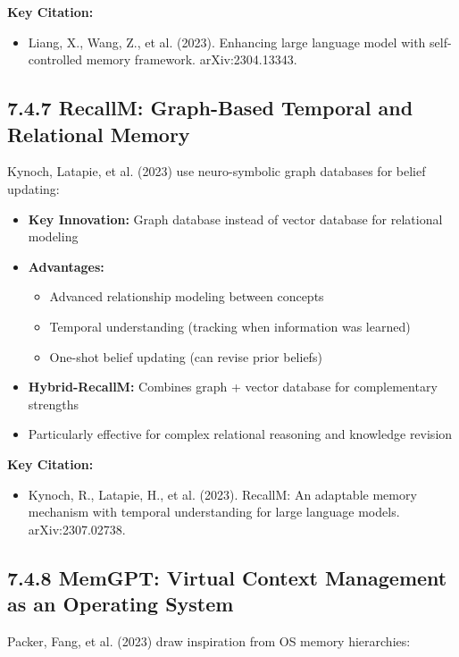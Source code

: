\documentclass[11pt,letterpaper]{article}
\begin{document}
\textbf{Key Citation:}
\begin{itemize}[leftmargin=*]
    \item Liang, X., Wang, Z., et al. (2023). Enhancing large language model with self-controlled memory framework. arXiv:2304.13343.
\end{itemize}

\subsection{7.4.7 RecallM: Graph-Based Temporal and Relational Memory}

Kynoch, Latapie, et al. (2023) use neuro-symbolic graph databases for belief updating:

\begin{itemize}[leftmargin=*]
    \item \textbf{Key Innovation:} Graph database instead of vector database for relational modeling
    \item \textbf{Advantages:}
    \begin{itemize}
        \item Advanced relationship modeling between concepts
        \item Temporal understanding (tracking when information was learned)
        \item One-shot belief updating (can revise prior beliefs)
    \end{itemize}
    \item \textbf{Hybrid-RecallM:} Combines graph + vector database for complementary strengths
    \item Particularly effective for complex relational reasoning and knowledge revision
\end{itemize}

\textbf{Key Citation:}
\begin{itemize}[leftmargin=*]
    \item Kynoch, R., Latapie, H., et al. (2023). RecallM: An adaptable memory mechanism with temporal understanding for large language models. arXiv:2307.02738.
\end{itemize}

\subsection{7.4.8 MemGPT: Virtual Context Management as an Operating System}

Packer, Fang, et al. (2023) draw inspiration from OS memory hierarchies:
\end{document}
